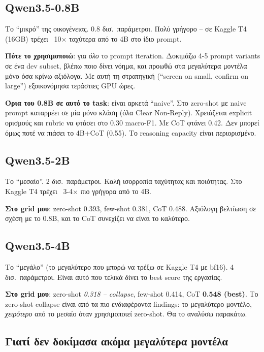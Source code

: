 \documentclass[12pt]{fphw}
\begin{document}
\subsection{Qwen3.5-0.8B}

Το ``μικρό'' της οικογένειας. 0.8 δισ.\ παράμετροι. Πολύ γρήγορο -- σε Kaggle T4 (16GB) τρέχει ~10× ταχύτερα από το 4B στο ίδιο prompt.

\textbf{Πότε το χρησιμοποιώ}: για \emph{όλο} το prompt iteration. Δοκιμάζω 4-5 prompt variants σε ένα dev subset, βλέπω ποιο δίνει νόημα, και προωθώ στα μεγαλύτερα μοντέλα μόνο όσα κρίνω αξιόλογα. Με αυτή τη στρατηγική (``screen on small, confirm on large'') εξοικονόμησα τεράστιες GPU ώρες.

\textbf{Όρια του 0.8B σε αυτό το task}: είναι αρκετά ``naive''. Στο zero-shot με naive prompt καταρρέει σε μία μόνο κλάση (όλα Clear Non-Reply). Χρειάζεται explicit ορισμούς και rubric να φτάσει στο 0.30 macro-F1. Με CoT φτάνει 0.42. Δεν μπορεί όμως ποτέ να πιάσει το 4B+CoT (0.55). Το reasoning capacity είναι περιορισμένο.

\subsection{Qwen3.5-2B}

Το ``μεσαίο''. 2 δισ.\ παράμετροι. Καλή ισορροπία ταχύτητας και ποιότητας. Στο Kaggle T4 τρέχει ~3-4× πιο γρήγορα από το 4B.

\textbf{Στο grid μου}: zero-shot 0.393, few-shot 0.381, CoT 0.488. Αξιόλογη βελτίωση σε σχέση με το 0.8B, και το CoT συνεχίζει να είναι το καλύτερο.

\subsection{Qwen3.5-4B}

Το ``μεγάλο'' (το μεγαλύτερο που μπορώ να τρέξω σε Kaggle T4 με bf16). 4 δισ.\ παράμετροι. Είναι αυτό που τελικά δίνει το best score της εργασίας.

\textbf{Στο grid μου}: zero-shot \emph{0.318 -- collapse}, few-shot 0.414, CoT \textbf{0.548 (best)}. Το zero-shot collapse είναι από τα πιο ενδιαφέροντα findings: το μεγαλύτερο μοντέλο, \emph{χειρότερο} από το μεσαίο όταν χρησιμοποιεί zero-shot. Θα το αναλύσω παρακάτω.

\subsection{Γιατί δεν δοκίμασα ακόμα μεγαλύτερα μοντέλα}
\end{document}
